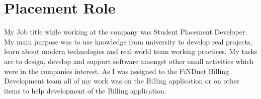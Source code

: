 \section{Placement Role}{
	My Job title while working at the company was Student Placement Developer. My main purpose was to use knowledge from university to develop real projects, learn about modern technologies and real world team working practices. My tasks are to design, develop and support software amongst other small activities which were in the companies interest. As I was assigned to the FiNDnet Billing Development team all of my work was on the Billing application or on other items to help development of the Billing application.
}